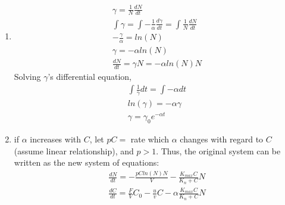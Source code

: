 \begin{homeworkProblem}[25]
\begin{enumerate}
    \item
    \begin{align*}
        \gamma = \frac{1}{N}\frac{dN}{dt} \\
        \int \gamma = \int {-\frac{1}{\alpha}\frac{d\gamma}{dt}} = \int \frac{1}{N}\frac{dN}{dt} \\
        -\frac{\gamma}{\alpha} = ln(N) \\
        \gamma = -\alpha ln(N) \\
        \frac{dN}{dt} = \gamma N = -\alpha ln(N) N
    \end{align*}
    Solving $\gamma$'s differential equation, \begin{align*}
        \int \frac{1}{\gamma}dt = \int -\alpha dt \\
        ln(\gamma) = -\alpha \gamma \\
        \gamma = \gamma_{0}e^{-\alpha t}
    \end{align*}
    
    \item
    if $\alpha$ increases with $C$, let $pC = $ rate which $\alpha$ changes with regard to $C$ (assume linear relationship), and $p>1$. Thus, the original system can be written as the new system of equations: \begin{align*}
        \frac{dN}{dt} = -\frac{pCln(N)N}{V} - \frac{K_{max}C}{K_n + C}N \\
        \frac{dC}{dt} = \frac{F}{V}C_0 - \frac{u}{v}C - \alpha\frac{K_{max}C}{K_n +C}N 
    \end{align*}
    
    
\end{enumerate}
\end{homeworkProblem}
